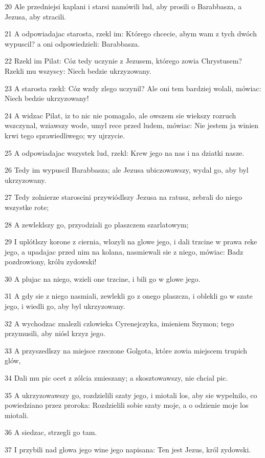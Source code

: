 \par 20 Ale przedniejsi kaplani i starsi namówili lud, aby prosili o Barabbasza, a Jezusa, aby stracili.
\par 21 A odpowiadajac starosta, rzekl im: Którego chcecie, abym wam z tych dwóch wypuscil? a oni odpowiedzieli: Barabbasza.
\par 22 Rzekl im Pilat: Cóz tedy uczynie z Jezusem, którego zowia Chrystusem? Rzekli mu wszyscy: Niech bedzie ukrzyzowany.
\par 23 A starosta rzekl: Cóz wzdy zlego uczynil? Ale oni tem bardziej wolali, mówiac: Niech bedzie ukrzyzowany!
\par 24 A widzac Pilat, iz to nic nie pomagalo, ale owszem sie wiekszy rozruch wszczynal, wziawszy wode, umyl rece przed ludem, mówiac: Nie jestem ja winien krwi tego sprawiedliwego; wy ujrzycie.
\par 25 A odpowiadajac wszystek lud, rzekl: Krew jego na nas i na dziatki nasze.
\par 26 Tedy im wypuscil Barabbasza; ale Jezusa ubiczowawszy, wydal go, aby byl ukrzyzowany.
\par 27 Tedy zolnierze staroscini przywiódlszy Jezusa na ratusz, zebrali do niego wszystke rote;
\par 28 A zewleklszy go, przyodziali go plaszczem szarlatowym;
\par 29 I uplótlszy korone z ciernia, wlozyli na glowe jego, i dali trzcine w prawa reke jego, a upadajac przed nim na kolana, nasmiewali sie z niego, mówiac: Badz pozdrowiony, królu zydowski!
\par 30 A plujac na niego, wzieli one trzcine, i bili go w glowe jego.
\par 31 A gdy sie z niego nasmiali, zewlekli go z onego plaszcza, i oblekli go w szate jego, i wiedli go, aby byl ukrzyzowany.
\par 32 A wychodzac znalezli czlowieka Cyrenejczyka, imieniem Szymon; tego przymusili, aby niósl krzyz jego.
\par 33 A przyszedlszy na miejsce rzeczone Golgota, które zowia miejscem trupich glów,
\par 34 Dali mu pic ocet z zólcia zmieszany; a skosztowawszy, nie chcial pic.
\par 35 A ukrzyzowawszy go, rozdzielili szaty jego, i miotali los, aby sie wypelnilo, co powiedziano przez proroka: Rozdzielili sobie szaty moje, a o odzienie moje los miotali.
\par 36 A siedzac, strzegli go tam.
\par 37 I przybili nad glowa jego wine jego napisana: Ten jest Jezus, król zydowski.
